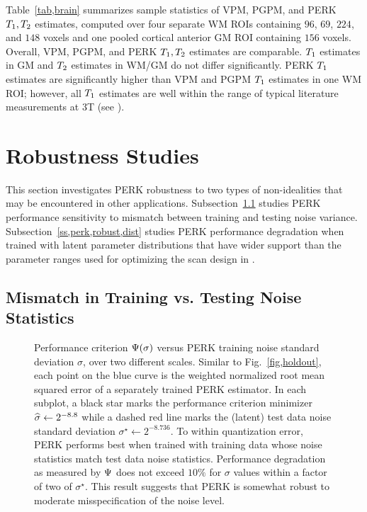 Table~\ref{tab,brain} summarizes sample statistics
of VPM, PGPM, and PERK $T_1,T_2$ estimates,
computed over four separate WM ROIs 
containing $96$, $69$, $224$, and $148$ voxels
and one pooled cortical anterior GM ROI 
containing $156$ voxels.
Overall,
VPM, PGPM, and PERK $T_1,T_2$ estimates are comparable.
$T_1$ estimates in GM
and $T_2$ estimates in WM/GM
do not differ significantly.
PERK $T_1$ estimates are significantly higher
than VPM and PGPM $T_1$ estimates 
in one WM ROI;
however,
all $T_1$ estimates 
are well within the range 
of typical literature measurements at 3T 
(see \eg \cite{wansapura:99:nrt, stanisz:05:ttr}).

\section{Robustness Studies}
\label{s,perk,robust}

This section investigates PERK robustness
to two types of non-idealities
that may be encountered 
in other applications.
Subsection~\ref{ss,perk,robust,noise} 
studies PERK performance sensitivity
to mismatch between training and testing noise variance.
Subsection~\ref{ss,perk,robust,dist}
studies PERK performance degradation
when trained 
with latent parameter distributions
that have wider support
than the parameter ranges
used for optimizing the scan design
in \cite{nataraj:17:oms}.

\subsection{Mismatch in Training vs. Testing Noise Statistics}
\label{ss,perk,robust,noise}

\begin{figure}[!t]
	\centering
	\hspace{0cm}
	\caption{%
		Performance criterion $\costa{\sigma}$
		versus PERK training noise standard deviation $\sigma$,
		over two different scales.
		Similar to Fig.~\ref{fig,holdout},
		each point on the blue curve
		is the weighted normalized root mean squared error
		of a separately trained PERK estimator.
		In each subplot,
		a black star marks 
		the performance criterion minimizer
		$\widehat{\sigma} \gets 2^{-8.8}$
		while a dashed red line
		marks the (latent) test data noise standard deviation 
		$\sigma^\star \gets 2^{-8.736}$.
		To within quantization error,
		PERK performs best 
		when trained with training data
		whose noise statistics 
		match test data noise statistics.
		Performance degradation as measured by $\Psi$ 
		does not exceed $10\%$
		for $\sigma$ values within a factor of two
		of $\sigma^\star$.
		This result suggests 
		that PERK is somewhat robust
		to moderate misspecification of the noise level.
	}%
	\label{fig,robust}
\end{figure}


